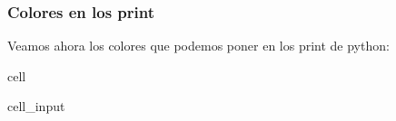 \documentclass[letterpaper,10pt,english]{jupyterBook}
\begin{document}
\subsubsection{Colores en los print}
\label{\detokenize{docs/01_01_Code_Blocks:colores-en-los-print}}
\sphinxAtStartPar
Veamos ahora los colores que podemos poner en los print de python:

\begin{sphinxuseclass}{cell}\begin{sphinxVerbatimInput}

\begin{sphinxuseclass}{cell_input}
\begin{sphinxVerbatim}[commandchars=\\\{\}]
  
  \PYG{l+s+s2}{[}    \PYG{l+s+s2}{[m}


\end{sphinxVerbatim}
\end{sphinxuseclass}
\end{sphinxVerbatimInput}
\end{sphinxuseclass}
\end{document}

